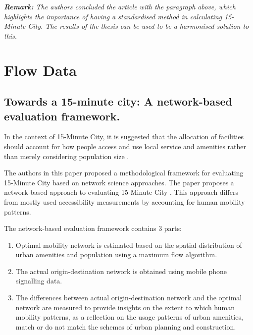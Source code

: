 
\textit{\textbf{Remark:} The authors concluded the article with the paragraph above, which highlights the importance of having a standardised method in calculating 15-Minute City. The results of the thesis can be used to be a harmonised solution to this.}

\section{Flow Data}

\subsection{Towards a 15-minute city: A network-based evaluation framework.} 

In the context of 15-Minute City, it is suggested that the allocation of facilities should account for how people access and use local service and amenities rather than merely considering population size \cite{chai_new_2020}.

The authors in this paper proposed a methodological framework for evaluating 15-Minute City based on network science approaches. The paper proposes a network-based approach to evaluating 15-Minute City \cite{zhang_towards_2023}. This approach differs from mostly used accessibility measurements by accounting for human mobility patterns.

The network-based evaluation framework contains 3 parts:

\begin{enumerate}
    \item Optimal mobility network is estimated based on the spatial distribution of urban amenities and population using a maximum flow algorithm.
    \item The actual origin-destination network is obtained using mobile phone signalling data.
    \item The differences between actual origin-destination network and the optimal network are measured to provide insights on the extent to which human mobility patterns, as a reflection on the usage patterns of urban amenities, match or do not match the schemes of urban planning and construction.
\end{enumerate}


